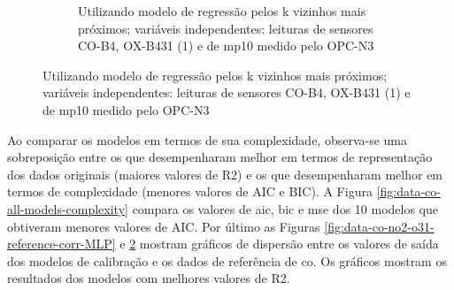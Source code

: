 \begin{figure}[h!]
\begin{subfigure}{0.495\textwidth}
        \caption{Utilizando modelo de regressão pelos k vizinhos mais próximos; variáveis independentes: leituras de sensores CO-B4, OX-B431 (1) e de \acrshort{mp10} medido pelo OPC-N3}
        \label{fig:data-co-o31-mp10-reference-corr-KNN}
    \end{subfigure}
\end{figure}

Ao comparar os modelos em termos de sua complexidade, observa-se uma sobreposição entre os que desempenharam melhor em termos de representação dos dados originais (maiores valores de R2) e os que desempenharam melhor em termos de complexidade (menores valores de AIC e BIC). A Figura \ref{fig:data-co-all-models-complexity} compara os valores de \acrshort{aic}, \acrshort{bic} e \acrshort{mse} dos 10 modelos que obtiveram menores valores de AIC. Por último as Figuras \ref{fig:data-co-no2-o31-reference-corr-MLP} e \ref{fig:data-co-o31-mp10-reference-corr-KNN} mostram gráficos de dispersão entre os valores de saída dos modelos de calibração e os dados de referência de \acrshort{co}. Os gráficos mostram os resultados dos modelos com melhores valores de R2.